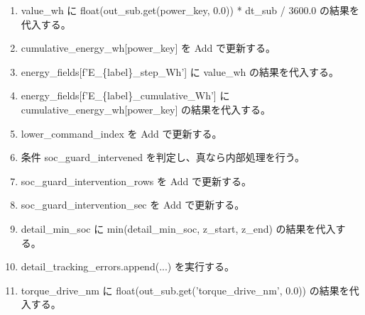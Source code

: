 \documentclass[a4paper,11pt]{article}
\begin{document}
\begin{enumerate}[leftmargin=1.8em]
\item   value\_wh に float(out\_sub.get(power\_key, 0.0)) * dt\_sub / 3600.0 の結果を代入する。
\item   cumulative\_energy\_wh[power\_key] を Add で更新する。
\item   energy\_fields[f'E\_\{label\}\_step\_Wh'] に value\_wh の結果を代入する。
\item   energy\_fields[f'E\_\{label\}\_cumulative\_Wh'] に cumulative\_energy\_wh[power\_key] の結果を代入する。
\item lower\_command\_index を Add で更新する。
\item 条件 soc\_guard\_intervened を判定し、真なら内部処理を行う。
\item   soc\_guard\_intervention\_rows を Add で更新する。
\item   soc\_guard\_intervention\_sec を Add で更新する。
\item detail\_min\_soc に min(detail\_min\_soc, z\_start, z\_end) の結果を代入する。
\item detail\_tracking\_errors.append(...) を実行する。
\item torque\_drive\_nm に float(out\_sub.get('torque\_drive\_nm', 0.0)) の結果を代入する。

\end{enumerate}
\end{document}

